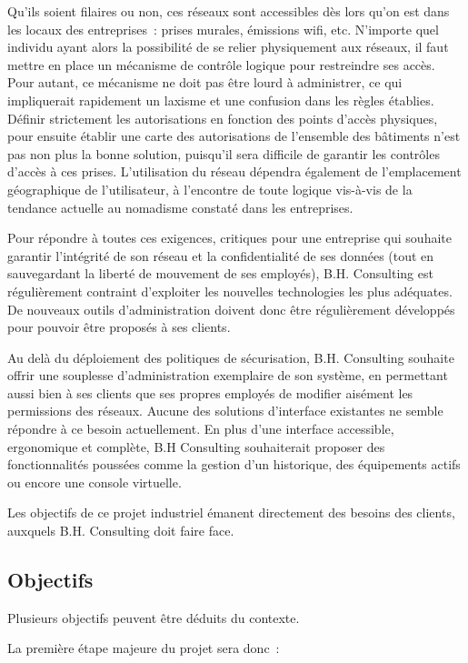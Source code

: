 Qu'ils soient filaires ou non, ces réseaux sont accessibles dès lors qu'on est dans les locaux des entreprises~: prises murales, émissions wifi, etc. N'importe quel individu ayant alors la possibilité de se relier physiquement aux réseaux, il faut mettre en place un mécanisme de contrôle logique pour restreindre ses accès. Pour autant, ce mécanisme ne doit pas être lourd à administrer, ce qui impliquerait rapidement un laxisme et une confusion dans les règles établies. Définir strictement les autorisations en fonction des points d'accès physiques, pour ensuite établir une carte des autorisations de l'ensemble des bâtiments n'est pas non plus la bonne solution, puisqu'il sera difficile de garantir les contrôles d'accès à ces prises. L'utilisation du réseau dépendra également de l'emplacement géographique de l'utilisateur, à l'encontre de toute logique vis-à-vis de la tendance actuelle au nomadisme constaté dans les entreprises.

Pour répondre à toutes ces exigences, critiques pour une entreprise qui souhaite garantir l'intégrité de son réseau et la confidentialité de ses données (tout en sauvegardant la liberté de mouvement de ses employés), B.H. Consulting est régulièrement contraint d'exploiter les nouvelles technologies les plus adéquates. De nouveaux outils d'administration doivent donc être régulièrement développés pour pouvoir être proposés à ses clients.

Au delà du déploiement des politiques de sécurisation, B.H. Consulting souhaite offrir une souplesse d'administration exemplaire de son système, en permettant aussi bien à ses clients que ses propres employés de modifier aisément les permissions des réseaux. Aucune des solutions d'interface existantes ne semble répondre à ce besoin actuellement. En plus d'une interface accessible, ergonomique et complète, B.H Consulting souhaiterait proposer des fonctionnalités poussées comme la gestion d'un historique, des équipements actifs ou encore une console virtuelle.

Les objectifs de ce projet industriel émanent directement des besoins des clients, auxquels B.H. Consulting doit faire face.

\subsection{Objectifs}

Plusieurs objectifs peuvent être déduits du contexte.

La première étape majeure du projet sera donc~:

